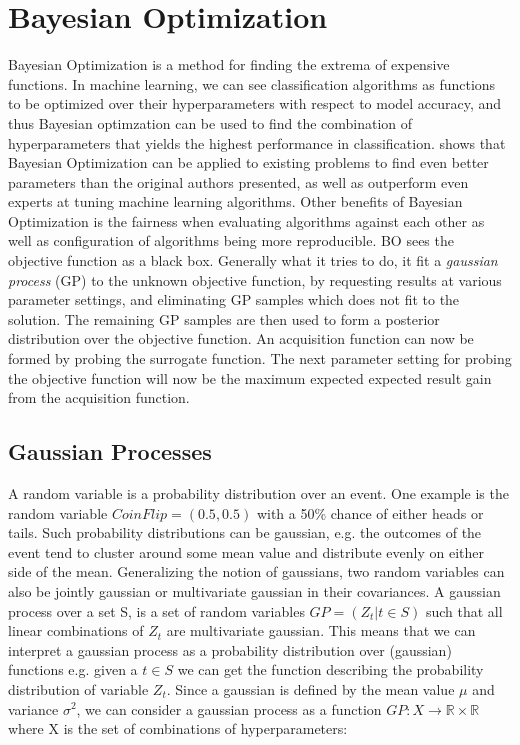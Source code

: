\section{Bayesian Optimization}\label{sec:bayesian-optimization}
Bayesian Optimization is a method for finding the extrema of expensive functions. In machine learning, we can see classification algorithms as functions to be optimized over their hyperparameters with respect to model accuracy, and thus Bayesian optimzation can be used to find the combination of hyperparameters that yields the highest performance in classification. \citet{snoek2012practical} shows that Bayesian Optimization can be applied to existing problems to find even better parameters than the original authors presented, as well as outperform even experts at tuning machine learning algorithms. Other benefits of Bayesian Optimization is the fairness when evaluating algorithms against each other as well as configuration of algorithms being more reproducible.
BO sees the objective function as a black box. Generally what it tries to do, it fit a \emph{gaussian process} (GP) to the unknown objective function, by requesting results at various parameter settings, and eliminating GP samples which does not fit to the solution. The remaining GP samples are then used to form a posterior distribution over the objective function. An acquisition function can now be formed by probing the surrogate function. The next parameter setting for probing the objective function will now be the maximum expected expected result gain from the acquisition function.
\begin{algorithm}
\end{algorithm}
\subsection{Gaussian Processes}
A random variable is a probability distribution over an event. One example is the random variable $CoinFlip = (0.5, 0.5)$ with a 50\% chance of either heads or tails. Such probability distributions can be gaussian, e.g. the outcomes of the event tend to cluster around some mean value and distribute evenly on either side of the mean. Generalizing the notion of gaussians, two random variables can also be jointly gaussian or multivariate gaussian in their covariances. A gaussian process over a set S, is a set of random variables $GP = (Z_t | t \in S)$ such that all linear combinations of $Z_t$ are multivariate gaussian. This means that we can interpret a gaussian process as a probability distribution over (gaussian) functions e.g. given a $t \in S$ we can get the function describing the probability distribution of variable $Z_t$. Since a gaussian is defined by the mean value $\mu$ and variance $\sigma^2$, we can consider a gaussian process as a function $GP : X \rightarrow \mathbb{R} \times \mathbb{R}$ where X is the set of combinations of hyperparameters:

